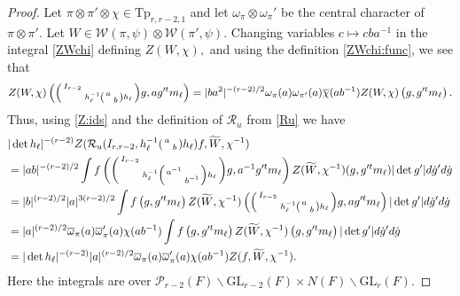 \documentclass[12pt]{amsart}
\theoremstyle{remark}
\numberwithin{equation}{section}
\newcommand{\GL}{\mathrm{GL}}
\theoremstyle{definition}
\newenvironment{psmatrix}
  {\left(\begin{smallmatrix}}
  {\end{smallmatrix}\right)}
\renewcommand{\bar}{\overline}
\numberwithin{equation}{subsection}
\begin{document}
\begin{proof}
Let $\pi \otimes \pi'\otimes \chi\in \mathrm{Tp}_{r,r-2,1}$ and let $\omega_{\pi}\otimes \omega_{\pi}'$ be the central character of $\pi\otimes \pi'$. Let $W \in \mathcal{W}(\pi,\psi) \otimes \mathcal{W}(\pi',\psi).$ Changing variables $c \mapsto cba^{-1}$ in the integral \eqref{ZWchi} defining $Z(W,\chi),$ and using the definition \eqref{ZWchi:func}, we see that 
\begin{align*}
    Z_{}(W,\chi)\left(\begin{psmatrix} I_{r-2} & \\ & h_\ell^{-1} \begin{psmatrix} a & \\ & b \end{psmatrix} h_\ell \end{psmatrix}g,ag'^tm_{\ell} \right)=|ba^2|^{-(r-2)/2}\omega_\pi(a)\omega_{\pi'}(a)\bar{\chi}(ab^{-1}) Z_{}(W,\chi)\left(g,g'^tm_{\ell} \right).
\end{align*}
Thus, using \eqref{Z:ids} and the definition of $\mathcal{R}_u$ from \eqref{Ru}  we have
\begin{align*}
    &|\det h_\ell|^{-(r-2)}Z(\mathcal{R}_u(I_{r,r-2},h_\ell^{-1}\begin{psmatrix} a & \\ & b \end{psmatrix} h_\ell)f,\widetilde{W},\chi^{-1})\\
    &=|ab|^{-(r-2)/2}\int f\left(\begin{psmatrix}
        I_{r-2} & \\
        & h_\ell^{-1}\begin{psmatrix} a^{-1} & \\ & b^{-1} \end{psmatrix} h_\ell
    \end{psmatrix}g,a^{-1}g'^tm_\ell \right)Z(\widetilde{W},\chi^{-1})(g,g'^tm_\ell) |\det g'|d\dot{g}'d\dot{g}\\
    &=|b|^{(r-2)/2}|a|^{3(r-2)/2}\int f\left(g,g'^tm_\ell \right)Z(\widetilde{W},\chi^{-1})\left(\begin{psmatrix}
        I_{r-2} & \\
        & h_\ell^{-1}\begin{psmatrix} a & \\ & b \end{psmatrix} h_\ell
    \end{psmatrix}g,ag'^tm_\ell\right) |\det g'|d\dot{g}'d\dot{g}\\
    &=|a|^{(r-2)/2}\bar{\omega}_{\pi}(a)\bar{\omega}_{\pi}'(a)\chi(ab^{-1})\int f\left(g,g'^tm_\ell \right)Z(\widetilde{W},\chi^{-1})\left(g,g'^tm_\ell\right) |\det g'|d\dot{g}'d\dot{g}\\
    &=|\det h_\ell|^{-(r-2)}|a|^{(r-2)/2}\bar{\omega}_{\pi}(a)\bar{\omega}_{\pi}'(a)\chi(ab^{-1})Z(f,\widetilde{W},\chi^{-1}).
\end{align*}
Here the integrals are over $\mathcal{P}_{r-2}(F) \backslash \GL_{r-2}(F) \times N(F) \backslash \GL_r(F).$





\end{proof}
\end{document}
